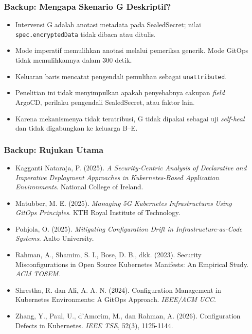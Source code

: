 {
\usebackgroundtemplate{\backgroundcontent}
\begin{frame}
    \frametitle{Backup: Mengapa Skenario G Deskriptif?}
    \small
    \begin{itemize}\setlength{\itemsep}{5pt}
        \item Intervensi G adalah anotasi metadata pada SealedSecret; nilai \texttt{spec.encryptedData} tidak dibaca atau ditulis.
        \item Mode imperatif memulihkan anotasi melalui pemeriksa generik. Mode GitOps tidak memulihkannya dalam 300 detik.
        \item Keluaran baris mencatat pengendali pemulihan sebagai \texttt{unattributed}.
        \item Penelitian ini tidak menyimpulkan apakah penyebabnya cakupan \textit{field} ArgoCD, perilaku pengendali SealedSecret, atau faktor lain.
        \item Karena mekanismenya tidak teratribusi, G tidak dipakai sebagai uji \textit{self-heal} dan tidak digabungkan ke keluarga B--E.
    \end{itemize}
\end{frame}
}

{
\usebackgroundtemplate{\backgroundcontent}
\begin{frame}
    \frametitle{Backup: Rujukan Utama}
    \scriptsize
    \begin{itemize}\setlength{\itemsep}{4pt}
        \item Kagganti Nataraja, P. (2025). \textit{A Security-Centric Analysis of Declarative and Imperative Deployment Approaches in Kubernetes-Based Application Environments}. National College of Ireland.
        \item Matubber, M. E. (2025). \textit{Managing 5G Kubernetes Infrastructures Using GitOps Principles}. KTH Royal Institute of Technology.
        \item Pohjola, O. (2025). \textit{Mitigating Configuration Drift in Infrastructure-as-Code Systems}. Aalto University.
        \item Rahman, A., Shamim, S. I., Bose, D. B., dkk. (2023). Security Misconfigurations in Open Source Kubernetes Manifests: An Empirical Study. \textit{ACM TOSEM}.
        \item Shrestha, R. dan Ali, A. A. N. (2024). Configuration Management in Kubernetes Environments: A GitOps Approach. \textit{IEEE/ACM UCC}.
        \item Zhang, Y., Paul, U., d'Amorim, M., dan Rahman, A. (2026). Configuration Defects in Kubernetes. \textit{IEEE TSE}, 52(3), 1125-1144.
    \end{itemize}
\end{frame}
}


